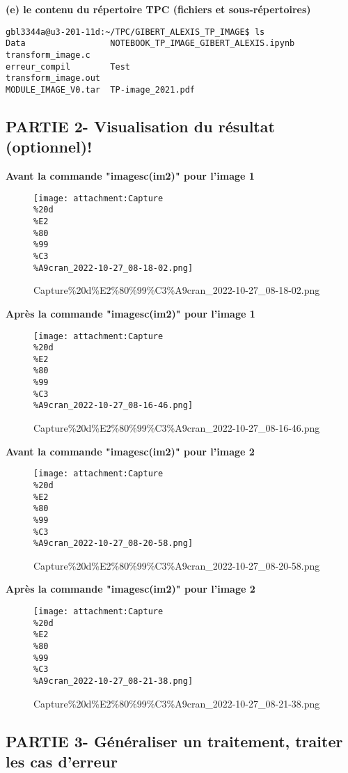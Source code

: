 \documentclass[11pt]{article}
\makeatletter
\def\maxwidth{\ifdim\Gin@nat@width>\linewidth\linewidth
    \else\Gin@nat@width\fi}
\let\Oldincludegraphics\includegraphics
\renewcommand{\includegraphics}[1]{\Oldincludegraphics[width=.8\maxwidth]{#1}}
\makeatother
\begin{document}
\textbf{(e) le contenu du répertoire TPC (fichiers et sous-répertoires)}

\begin{verbatim}
gbl3344a@u3-201-11d:~/TPC/GIBERT_ALEXIS_TP_IMAGE$ ls
Data                 NOTEBOOK_TP_IMAGE_GIBERT_ALEXIS.ipynb  transform_image.c
erreur_compil        Test                                   transform_image.out
MODULE_IMAGE_V0.tar  TP-image_2021.pdf
\end{verbatim}

    \subsection{PARTIE 2- Visualisation du résultat
(optionnel)!}\label{partie-2--visualisation-du-ruxe9sultat-optionnel}

\textbf{Avant la commande "imagesc(im2)" pour l'image 1}

\begin{figure}
\centering
\texttt{[image: attachment:Capture\\\%20d\\\%E2\\\%80\\\%99\\\%C3\\\%A9cran\_2022-10-27\_08-18-02.png]}
\caption{Capture\%20d\%E2\%80\%99\%C3\%A9cran\_2022-10-27\_08-18-02.png}
\end{figure}

\textbf{Après la commande "imagesc(im2)" pour l'image 1}

\begin{figure}
\centering
\texttt{[image: attachment:Capture\\\%20d\\\%E2\\\%80\\\%99\\\%C3\\\%A9cran\_2022-10-27\_08-16-46.png]}
\caption{Capture\%20d\%E2\%80\%99\%C3\%A9cran\_2022-10-27\_08-16-46.png}
\end{figure}

\textbf{Avant la commande "imagesc(im2)" pour l'image 2}

\begin{figure}
\centering
\texttt{[image: attachment:Capture\\\%20d\\\%E2\\\%80\\\%99\\\%C3\\\%A9cran\_2022-10-27\_08-20-58.png]}
\caption{Capture\%20d\%E2\%80\%99\%C3\%A9cran\_2022-10-27\_08-20-58.png}
\end{figure}

\textbf{Après la commande "imagesc(im2)" pour l'image 2}

\begin{figure}
\centering
\texttt{[image: attachment:Capture\\\%20d\\\%E2\\\%80\\\%99\\\%C3\\\%A9cran\_2022-10-27\_08-21-38.png]}
\caption{Capture\%20d\%E2\%80\%99\%C3\%A9cran\_2022-10-27\_08-21-38.png}
\end{figure}

    \subsection{PARTIE 3- Généraliser un traitement, traiter les cas
d'erreur}\label{partie-3--guxe9nuxe9raliser-un-traitement-traiter-les-cas-derreur}
\end{document}
